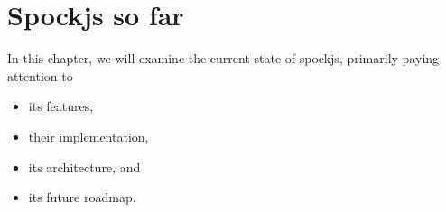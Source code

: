 \chapter{Spockjs so far}
In this chapter, we will examine the current state of spockjs,
primarily paying attention to
\begin{itemize}
  \item its features,
  \item their implementation,
  \item its architecture, and
  \item its future roadmap.
\end{itemize}






